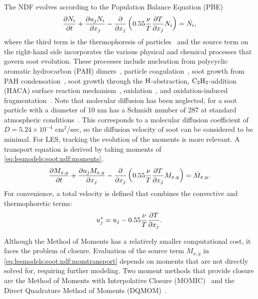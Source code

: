 The NDF evolves according to the Population Balance Equation (PBE)~\cite{friedlander2000}
\begin{equation}\label{eq:lesmodels:soot:ndf:pbe}
  \tder{N_i} - \pder[]{x_j}\left( 0.55\frac{\nu}{T}\pder[T]{x_j}N_i \right) = \dot{N_i},
\end{equation}
where the third term is the thermophoresis of particles~\cite{waldmann1966} and the source term on the right-hand side incorporates the various physical and chemical processes that govern soot evolution. These processes include nucleation from polycyclic aromatic hydrocarbon (PAH) dimers~\cite{blanquart2009,schuetz2002,frenklach1991,wang2011}, particle coagulation~\cite{kazakov1998,hmom2009}, soot growth from PAH condensation~\cite{blanquart2009,hmom2009}, soot growth through the $\ce{H}$-abstraction, $\ce{C2H2}$-addition (HACA) surface reaction mechanism~\cite{frenklach1985,frenklach1991}, oxidation~\cite{stanmore2001,neoh1981,kazakov1995}, and oxidation-induced fragmentation~\cite{neoh1985,mueller2011}. Note that molecular diffusion has been neglected, for a soot particle with a diameter of 10 nm has a Schmidt number of 287 at standard atmospheric conditions~\cite{friedlander2000}. This corresponds to a molecular diffusion coefficient of $D = 5.24\times 10^{-4}$ cm$^2$/sec, so the diffusion velocity of soot can be considered to be minimal. For LES, tracking the evolution of the moments is more relevant. A transport equation is derived by taking moments of \cref{eq:lesmodels:soot:ndf:moments},
\begin{equation}\label{eq:lesmodels:soot:ndf:momtransport}
  \tder{M_{x,y}} - \pder[]{x_j}\left( 0.55\frac{\nu}{T}\pder[T]{x_j}M_{x,y} \right) = \dot{M}_{x,y}.
\end{equation}
For convenience, a total velocity is defined that combines the convective and thermophoretic terms:
\begin{equation}\label{eq:lesmodels:soot:ndf:totvel}
  u_j^* = u_j - 0.55\frac{\nu}{T}\pder[T]{x_j}.
\end{equation}

Although the Method of Moments has a relatively smaller computational cost, it faces the problem of closure. Evaluation of the source term $\dot{M}_{x,y}$ in \cref{eq:lesmodels:soot:ndf:momtransport} depends on moments that are not directly solved for, requiring further modeling. Two moment methods that provide closure are the Method of Moments with Interpolative Closure (MOMIC)~\cite{frenklach2002,frenklach1987,frenklach1994} and the Direct Quadrature Method of Moments (DQMOM)~\cite{marchisio2005}.

